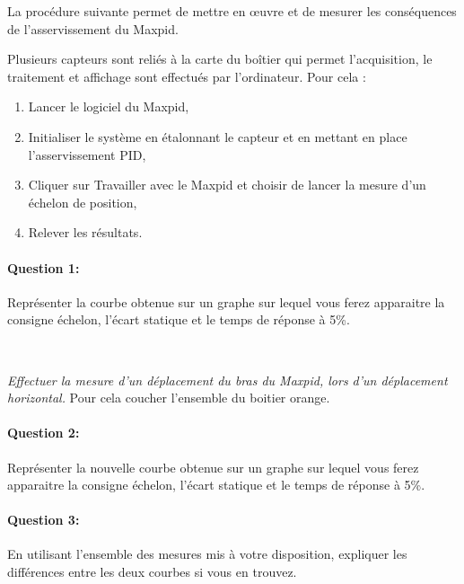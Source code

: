 

\ifdef{\public}{\cleardoublepage}{}



La procédure suivante permet de mettre en \oe uvre et de mesurer les conséquences de l'asservissement du Maxpid.

Plusieurs capteurs sont reliés à la carte du boîtier qui permet l'acquisition, le traitement et affichage sont effectués par l'ordinateur. Pour cela :
\begin{enumerate}
 \item Lancer le logiciel du Maxpid,
 \item Initialiser le système en étalonnant le capteur et en mettant en place l'asservissement PID,
 \item Cliquer sur Travailler avec le Maxpid et choisir de lancer la mesure d'un échelon de position,
 \item Relever les résultats.
\end{enumerate} 

\paragraph{Question 1:} Représenter la courbe obtenue sur un graphe sur lequel vous ferez apparaitre la consigne échelon, l'écart statique et le temps de réponse à 5\%.

~\

\textit{Effectuer la mesure d'un déplacement du bras du Maxpid, lors d'un déplacement horizontal.} Pour cela coucher l'ensemble du boitier orange.

\paragraph{Question 2:} Représenter la nouvelle courbe obtenue sur un graphe sur lequel vous ferez apparaitre la consigne échelon, l'écart statique et le temps de réponse à 5\%.

\paragraph{Question 3:} En utilisant l'ensemble des mesures mis à votre disposition, expliquer les différences entre les deux courbes si vous en trouvez.

